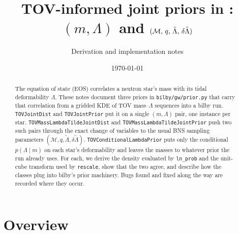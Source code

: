 \documentclass[11pt,a4paper]{article}
\title{TOV-informed joint priors in \code{bilby.gw.prior}:\\
$(m, \Lambda)$ and $(\Mc,\, q,\, \lt,\, \dlt)$}
\author{Derivation and implementation notes}
\date{\today}
\newcommand{\Mc}{\mathcal{M}}
\newcommand{\lt}{\tilde{\Lambda}}
\newcommand{\dlt}{\delta\tilde{\Lambda}}
\newcommand{\code}[1]{\texttt{#1}}
\begin{document}
\sloppy
\maketitle

\begin{abstract}
\noindent
The equation of state (EOS) correlates a neutron star's mass with its tidal
deformability $\Lambda$. These notes document three priors in
\code{bilby/gw/prior.py} that carry that correlation from a gridded KDE of TOV
mass--$\Lambda$ sequences into a bilby run. \code{TOVJointDist} and
\code{TOVJointPrior} put it on a single $(m, \Lambda)$ pair, one instance per
star. \code{TOVMassLambdaTildeJointDist} and \code{TOVMassLambdaTildeJointPrior}
push two such pairs through the exact change of variables to the usual BNS
sampling parameters $(\Mc, q, \lt, \dlt)$. \code{TOVConditionalLambdaPrior}
puts only the conditional $p(\Lambda \mid m)$ on each star's deformability and
leaves the masses to whatever prior the run already uses. For each, we derive
the density evaluated by \code{ln\_prob} and the unit-cube transform used by
\code{rescale}, show that the two agree, and describe how the classes plug into
bilby's prior machinery. Bugs found and fixed along the way are recorded
where they occur.
\end{abstract}

\tableofcontents

\section{Overview}
\end{document}
